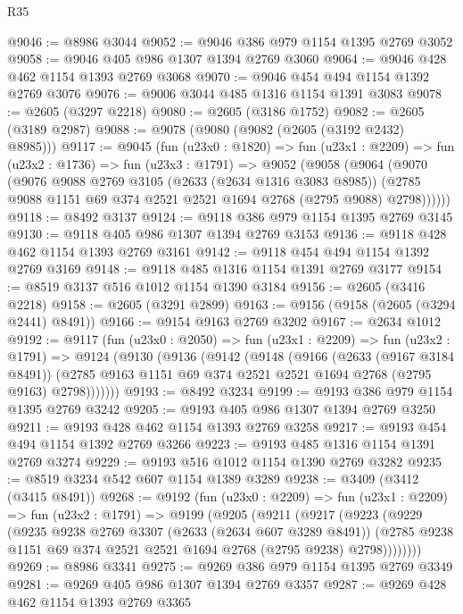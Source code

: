 \begin{lexlean}{R35}
\begin{coremodule}
@9046 := @8986 @3044
@9052 := @9046 @386 @979 @1154 @1395 @2769 @3052
@9058 := @9046 @405 @986 @1307 @1394 @2769 @3060
@9064 := @9046 @428 @462 @1154 @1393 @2769 @3068
@9070 := @9046 @454 @494 @1154 @1392 @2769 @3076
@9076 := @9006 @3044 @485 @1316 @1154 @1391 @3083
@9078 := @2605 (@3297 @2218)
@9080 := @2605 (@3186 @1752)
@9082 := @2605 (@3189 @2987)
@9088 := @9078 (@9080 (@9082 (@2605 (@3192 @2432) @8985)))
@9117 := @9045
    (fun (u23x0 : @1820) =>
    fun (u23x1 : @2209) =>
    fun (u23x2 : @1736) =>
    fun (u23x3 : @1791) =>
    @9052
      (@9058
        (@9064
          (@9070
            (@9076
              @9088
              @2769
              @3105
              (@2633 (@2634 @1316 @3083 @8985))
              (@2785 @9088 @1151 @69 @374 @2521 @2521 @1694 @2768 (@2795 @9088) @2798))))))
@9118 := @8492 @3137
@9124 := @9118 @386 @979 @1154 @1395 @2769 @3145
@9130 := @9118 @405 @986 @1307 @1394 @2769 @3153
@9136 := @9118 @428 @462 @1154 @1393 @2769 @3161
@9142 := @9118 @454 @494 @1154 @1392 @2769 @3169
@9148 := @9118 @485 @1316 @1154 @1391 @2769 @3177
@9154 := @8519 @3137 @516 @1012 @1154 @1390 @3184
@9156 := @2605 (@3416 @2218)
@9158 := @2605 (@3291 @2899)
@9163 := @9156 (@9158 (@2605 (@3294 @2441) @8491))
@9166 := @9154 @9163 @2769 @3202
@9167 := @2634 @1012
@9192 := @9117
    (fun (u23x0 : @2050) =>
    fun (u23x1 : @2209) =>
    fun (u23x2 : @1791) =>
    @9124
      (@9130
        (@9136
          (@9142
            (@9148
              (@9166
                (@2633 (@9167 @3184 @8491))
                (@2785 @9163 @1151 @69 @374 @2521 @2521 @1694 @2768 (@2795 @9163) @2798)))))))
@9193 := @8492 @3234
@9199 := @9193 @386 @979 @1154 @1395 @2769 @3242
@9205 := @9193 @405 @986 @1307 @1394 @2769 @3250
@9211 := @9193 @428 @462 @1154 @1393 @2769 @3258
@9217 := @9193 @454 @494 @1154 @1392 @2769 @3266
@9223 := @9193 @485 @1316 @1154 @1391 @2769 @3274
@9229 := @9193 @516 @1012 @1154 @1390 @2769 @3282
@9235 := @8519 @3234 @542 @607 @1154 @1389 @3289
@9238 := @3409 (@3412 (@3415 @8491))
@9268 := @9192
    (fun (u23x0 : @2209) =>
    fun (u23x1 : @2209) =>
    fun (u23x2 : @1791) =>
    @9199
      (@9205
        (@9211
          (@9217
            (@9223
              (@9229
                (@9235
                  @9238
                  @2769
                  @3307
                  (@2633 (@2634 @607 @3289 @8491))
                  (@2785 @9238 @1151 @69 @374 @2521 @2521 @1694 @2768 (@2795 @9238) @2798))))))))
@9269 := @8986 @3341
@9275 := @9269 @386 @979 @1154 @1395 @2769 @3349
@9281 := @9269 @405 @986 @1307 @1394 @2769 @3357
@9287 := @9269 @428 @462 @1154 @1393 @2769 @3365

\end{coremodule}
\end{lexlean}
